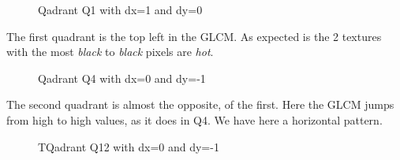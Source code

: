 \documentclass{article}
\begin{document}
	\begin{figure}[h!]%
		\centering
    	\caption{Qadrant Q1 with dx=1 and dy=0}%
    	\label{fig:o3_q1}%
	\end{figure}
The first quadrant is the top left in the GLCM. As expected is the 2 textures
with the most \textit{black}  to  \textit{black} pixels are \textit{hot}.   
\newpage
	\begin{figure}[h!]%
		\centering
    	\caption{Qadrant Q4 with dx=0 and dy=-1}%
    	\label{fig:o3_q4}%
	\end{figure}
The second quadrant is almost the opposite, of the first. Here the GLCM jumps from high to high values, as it does in Q4. We have here a horizontal pattern. 
\newpage
	\begin{figure}[h!]%
		\centering
    	\caption{TQadrant Q12 with dx=0 and dy=-1}%
    	\label{fig:o3_q12}%
	\end{figure}
\end{document}
